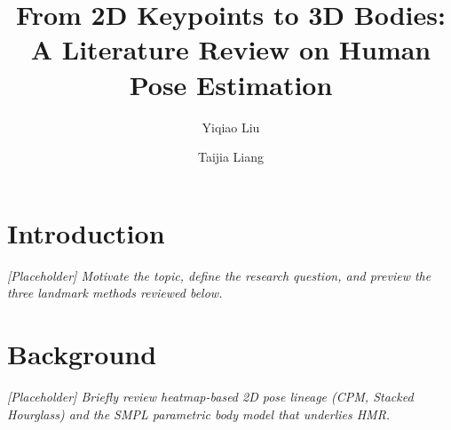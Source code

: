 \documentclass[11pt]{article}
\title{\vspace{-1.2em}From 2D Keypoints to 3D Bodies:\\
  A Literature Review on Human Pose Estimation}
\author{Yiqiao Liu \and Taijia Liang}
\affil{Introduction to Computer Vision, Spring 2026}
\date{\vspace{-1em}}
\begin{document}
\maketitle
\vspace{-1.5em}

\section{Introduction}
\textit{[Placeholder] Motivate the topic, define the research question, and
preview the three landmark methods reviewed below.}

\section{Background}
\textit{[Placeholder] Briefly review heatmap-based 2D pose lineage (CPM,
Stacked Hourglass) and the SMPL parametric body model that underlies HMR.}
\end{document}
